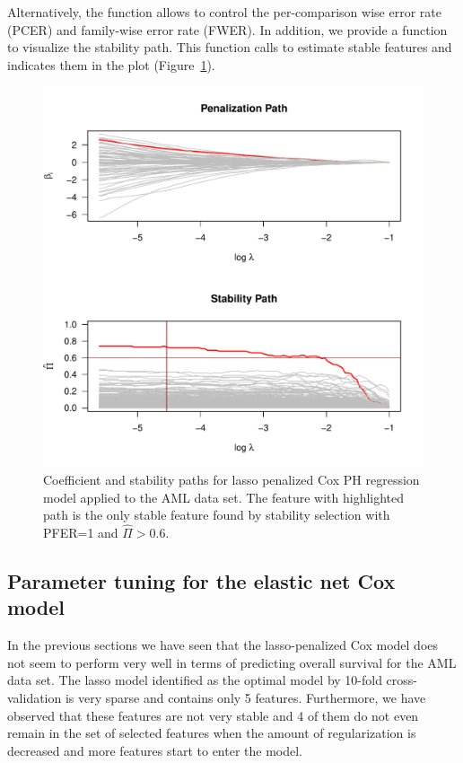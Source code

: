 \documentclass[nojss]{jss}
\begin{document}
Alternatively, the  function allows to control the per-comparison wise error rate (PCER) and family-wise error rate (FWER). In addition, we provide a  function to visualize the stability path. This function calls  to estimate stable features and indicates them in the plot (Figure~\ref{stab:path}).

\begin{figure}[t!]
\begin{center}
\includegraphics{c060_vignette-stabilitySelection3}
\end{center}
\caption{Coefficient and stability paths for lasso penalized Cox PH regression model applied to the AML data set. The feature with highlighted path is the only stable feature found by stability selection with PFER=1 and $\hat\Pi >0.6$.}
\label{stab:path}
\end{figure}

\subsection{Parameter tuning for the elastic net Cox model}

In the previous sections we have seen that the lasso-penalized Cox model does not seem to perform very well in terms of predicting overall survival for the AML data set. 
The lasso model identified as the optimal model by 10-fold cross-validation is very sparse and contains only 5 features.
Furthermore, we have observed that these features are not very stable and 4 of them do not even remain in the set of selected features when the amount of regularization is decreased and more features start to enter the model.
\end{document}
